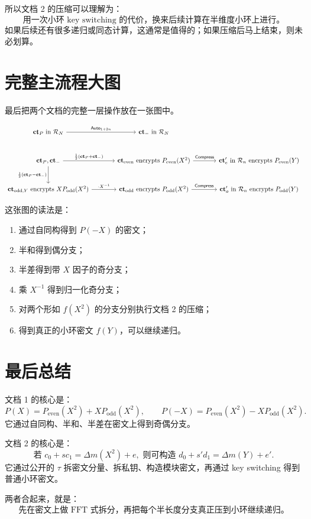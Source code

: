 \documentclass[11pt]{article}
\newcommand{\Rbig}{\mathcal R_N}
\newcommand{\Rsmall}{\mathcal R_n}
\newcommand{\Pe}{P_{\mathrm{even}}}
\newcommand{\Po}{P_{\mathrm{odd}}}
\newcommand{\ct}{\mathbf{ct}}
\newcommand{\ctP}{\mathbf{ct}_P}
\newcommand{\cte}{\mathbf{ct}_{\mathrm{even}}}
\newcommand{\cto}{\mathbf{ct}_{\mathrm{odd}}}
\newcommand{\ctoy}{\mathbf{ct}_{\mathrm{odd},Y}}
\newcommand{\Comp}{\mathsf{Compress}}
\newcommand{\Auto}{\mathsf{Auto}}
\begin{document}
所以文档 2 的压缩可以理解为：
\[
\boxed{\text{用一次小环 key switching 的代价，换来后续计算在半维度小环上进行。}}
\]
如果后续还有很多递归或同态计算，这通常是值得的；如果压缩后马上结束，则未必划算。

\section{完整主流程大图}

最后把两个文档的完整一层操作放在一张图中。

\[
\begin{tikzcd}[column sep=large,row sep=large]
\ctP \text{ in } \Rbig
  \arrow[r,"\Auto_{1+2n}"]
&
\ct_- \text{ in } \Rbig
\\
\ctP,\ct_-
  \arrow[r,"\frac{1}{2}(\ctP+\ct_-)"]
  \arrow[d,"\frac{1}{2}(\ctP-\ct_-)"']
&
\cte \text{ encrypts } \Pe(X^2)
  \arrow[r,"\Comp"]
&
\ct'_e \text{ in } \Rsmall \text{ encrypts } \Pe(Y)
\\
\ctoy \text{ encrypts } X\Po(X^2)
  \arrow[r,"\cdot X^{-1}"]
&
\cto \text{ encrypts } \Po(X^2)
  \arrow[r,"\Comp"]
&
\ct'_o \text{ in } \Rsmall \text{ encrypts } \Po(Y)
\end{tikzcd}
\]

这张图的读法是：
\begin{enumerate}
  \item 通过自同构得到 $P(-X)$ 的密文；
  \item 半和得到偶分支；
  \item 半差得到带 $X$ 因子的奇分支；
  \item 乘 $X^{-1}$ 得到归一化奇分支；
  \item 对两个形如 $f(X^2)$ 的分支分别执行文档 2 的压缩；
  \item 得到真正的小环密文 $f(Y)$，可以继续递归。
\end{enumerate}

\section*{最后总结}

文档 1 的核心是：
\[
\boxed{
P(X)=\Pe(X^2)+X\Po(X^2),
\qquad
P(-X)=\Pe(X^2)-X\Po(X^2).
}
\]
它通过自同构、半和、半差在密文上得到奇偶分支。

文档 2 的核心是：
\[
\boxed{
\text{若 } c_0+s c_1=\Delta m(X^2)+e,
\text{ 则可构造 } d_0+s'd_1=\Delta m(Y)+e'.
}
\]
它通过公开的 $\tau$ 拆密文分量、拆私钥、构造模块密文，再通过 key switching 得到普通小环密文。

两者合起来，就是：
\[
\boxed{
\text{先在密文上做 FFT 式拆分，再把每个半长度分支真正压到小环继续递归。}
}
\]
\end{document}
